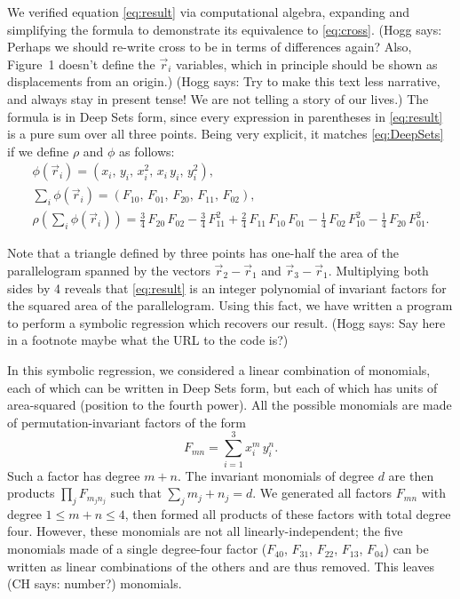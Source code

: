 \documentclass[12pt]{article}
\newcommand{\CH}[1]{{\color{blue} (CH says: #1)}}
\newcommand{\Hogg}[1]{{\color{violet} (Hogg says: #1)}}
\newcommand{\pseudosection}[1]
{}
\begin{document}
We verified equation \eqref{eq:result} via computational algebra, expanding and simplifying the formula to demonstrate its equivalence to \eqref{eq:cross}.
\Hogg{Perhaps we should re-write cross to be in terms of differences again? Also, Figure~1 doesn't define the $\vec{r}_i$ variables, which in principle should be shown as displacements from an origin.}
\Hogg{Try to make this text less narrative, and always stay in present tense! We are not telling a story of our lives.}
The formula is in Deep Sets form, since
every expression in parentheses in \eqref{eq:result} is a pure sum over all three points.
Being very explicit, it matches \eqref{eq:DeepSets} if we define $\rho$ and $\phi$ as follows:
\begin{equation}
\begin{gathered}
    \phi(\vec{r}_i) = (
        x_i, \,
        y_i, \,
        x_i^2, \,
        x_i \, y_i, \,
        y_i^2
    ), \\
    {\textstyle \sum_i} \phi(\vec{r}_i) = (
        F_{10}, \,
        F_{01}, \,
        F_{20}, \,
        F_{11}, \,
        F_{02}
    ), \\
    \rho \left( {\textstyle \sum_i} \phi(\vec{r}_i) \right)
    = \tfrac{3}{4} \, F_{20} \, F_{02}
    - \tfrac{3}{4} \, F_{11}^2
    + \tfrac{2}{4} \, F_{11} \, F_{10} \, F_{01}
    - \tfrac{1}{4} \, F_{02} \, F_{10}^2
    - \tfrac{1}{4} \, F_{20} \, F_{01}^2.
\end{gathered}
\end{equation}

\pseudosection{A note on symbolic regression}

Note that a triangle defined by three points has one-half the area of the parallelogram spanned by the vectors $\vec{r}_2 - \vec{r}_1$ and $\vec{r}_3 - \vec{r}_1$.
Multiplying both sides by 4 reveals that \eqref{eq:result} is an integer polynomial of invariant factors for the squared area of the parallelogram.
Using this fact, we have written a program to perform a symbolic regression which recovers our result.
\Hogg{Say here in a footnote maybe what the URL to the code is?}

In this symbolic regression, we considered a linear combination of monomials, each of which can be written in Deep Sets form, but each of which has units of area-squared (position to the fourth power).
All the possible monomials are made of permutation-invariant factors of the form 
\begin{equation}
F_{mn} = \sum_{i=1}^{3} x_i^m \, y_i^n.
\end{equation}
Such a factor has degree $m + n$.
The invariant monomials of degree $d$ are then products $\prod_j F_{m_j n_j}$ such that $\sum_j m_j + n_j = d$.
We generated all factors $F_{mn}$ with degree $1 \leq m + n \leq 4$, then formed all products of these factors with total degree four.
However, these monomials are not all linearly-independent;
the five monomials made of a single degree-four factor ($F_{40}$, $F_{31}$, $F_{22}$, $F_{13}$, $F_{04}$) can be written as linear combinations of the others and are thus removed.
This leaves \CH{number?} monomials.
\end{document}
